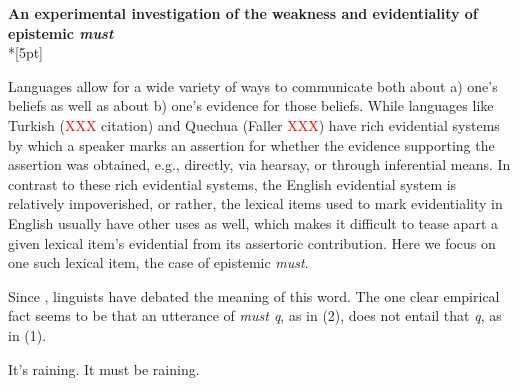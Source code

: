 \documentclass[11pt]{article}
\newcommand{\red}[1]{\textcolor{Red}{#1}}
\begin{document}
\begin{center}\textbf{An experimental investigation of the weakness and evidentiality of epistemic \emph{must}}\\*[5pt]
\end{center}

\vspace{-11pt}


Languages allow for a wide variety of ways to communicate both about a) one's beliefs as well as about b) one's evidence for those beliefs. While languages like Turkish (\red{XXX} citation) and Quechua (Faller \red{XXX}) have rich evidential systems by which a speaker marks an assertion for whether the evidence supporting the assertion was obtained, e.g., directly, via hearsay, or through inferential means. In contrast to these rich evidential systems, the English evidential system is relatively impoverished, or rather, the lexical items used to mark evidentiality in English usually have other uses as well, which makes it difficult to tease apart a given lexical item's evidential from its assertoric contribution. Here we focus on one such lexical item, the case of epistemic \emph{must}.

Since , linguists have debated the meaning of this word. The one clear empirical fact seems to be that an utterance of \emph{must q}, as in (2), does not entail that \emph{q}, as in (1). 


\vspace{-8pt}
\begin{exe}
\ex\label{inference} 
\begin{xlist}
\ex\label{bare}  It's raining.
\ex\label{must} It must be raining.
\end{xlist}
\end{exe}
\vspace{-8pt}
\end{document}
